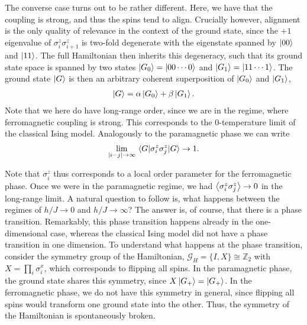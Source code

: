 The converse case turns out to be rather different. Here, we have that the
coupling is strong, and thus the spins tend to align. Crucially however,
alignment is the only quality of relevance in the context of the ground state,
since the $+1$ eigenvalue of $\sigma_i^z\sigma_{i+1}^z$ is two-fold degenerate
with the eigenstate spanned by $\ket{00}$ and $\ket{11}$. The full Hamiltonian
then inherits this degeneracy, such that its ground state space is spanned by
two states $\ket{G_0} = \ket{00\cdots 0}$ and $\ket{G_1} = \ket{11\cdots 1}$.
The ground state $\ket{G}$ is then an arbitrary coherent superposition of $\ket{G_0}$ and
$\ket{G_1}$,
\begin{align}
  \ket{G} = \alpha \ket{G_0} + \beta \ket{G_1}
.\end{align}
Note that we here do have long-range order, since we are in the
regime, where ferromagnetic coupling is strong. This corresponds to the
0-temperature limit of the classical Ising model. Analogously to the
paramagnetic phase we can write
\begin{align}
  \lim_{\abs{i-j}\to\infty} \expval{\sigma_i^z\sigma_j^z}{G} \to 1
.\end{align}

Note that $\sigma_i^z$ thus corresponds to a local order parameter for the
ferromagnetic phase. Once we were in the paramagnetic regime, we had
$\expval{\sigma_i^z\sigma_j^z}\to 0$ in the long-range limit. A natural
question to follow is, what happens between the regimes of
$h /J \to 0$ and $h /J \to \infty$? The answer is, of course, that there is a phase
transition. Remarkably, this phase transition happens already in the
one-dimensional case, whereas the classical Ising model did not have a phase
transition in one dimension. To understand what happens at the phase
transition, consider the symmetry group of the Hamiltonian, $\mathcal{G}_H =
\{I, X\} \cong \mathbb{Z}_2$ with $X = \prod_i \sigma_i^x$, which
corresponds to flipping all spins. In the paramagnetic phase, the ground state
shares this symmetry, since $X\ket{G_+} = \ket{G_+}$. In the ferromagnetic
phase, we do not have this symmetry in general, since flipping all spins would
transform one ground state into the other. Thus, the symmetry of the
Hamiltonian is spontaneously broken. 
